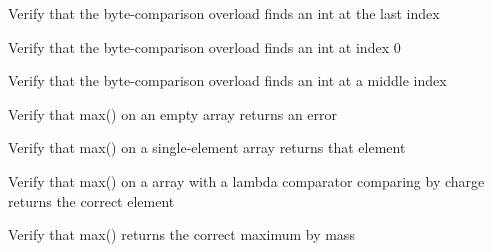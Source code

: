 \begin{DoxyRefList}
%
Verify that the byte-\/comparison overload finds an int at the last index  
\item[Global \doxylink{test__array_8cpp_a2aeee4444ac4a8c1fb3f1c0847d5bbf0}{TEST\+\_\+F} (\doxylink{classArrayInitTest}{Array\+Init\+Test}, Contains\+Byte\+Int\+Finds\+First\+Element)]\label{test__test000167}%
%
Verify that the byte-\/comparison overload finds an int at index 0  
\item[Global \doxylink{test__array_8cpp_ab0bb7275e02d659f2c5b07dd69d661af}{TEST\+\_\+F} (\doxylink{classArrayInitTest}{Array\+Init\+Test}, Contains\+Byte\+Int\+Finds\+Middle\+Element)]\label{test__test000166}%
%
Verify that the byte-\/comparison overload finds an int at a middle index  
\item[Global \doxylink{test__array_8cpp_a40c5438a3304dee13809b7b9ece57088}{TEST\+\_\+F} (\doxylink{classArrayInitTest}{Array\+Init\+Test}, Max\+Particle\+Empty\+Array\+Returns\+Error)]\label{test__test000165}%
%
Verify that max() on an empty  array returns an error  
\item[Global \doxylink{test__array_8cpp_a0835b2523307141187e42164728d918f}{TEST\+\_\+F} (\doxylink{classArrayInitTest}{Array\+Init\+Test}, Max\+Particle\+Single\+Element)]\label{test__test000164}%
%
Verify that max() on a single-\/element  array returns that element  
\item[Global \doxylink{test__array_8cpp_a84563c8e20606653b3adc0f4b27eb097}{TEST\+\_\+F} (\doxylink{classArrayInitTest}{Array\+Init\+Test}, Max\+Particle\+By\+Charge\+With\+Lambda)]\label{test__test000163}%
%
Verify that max() on a  array with a lambda comparator comparing by charge returns the correct element  
\item[Global \doxylink{test__array_8cpp_a82f0563e080e9d429aee7bb007549e00}{TEST\+\_\+F} (\doxylink{classArrayInitTest}{Array\+Init\+Test}, Max\+Particle\+By\+Mass\+Returns\+Correct\+Value)]\label{test__test000162}%
%
Verify that max() returns the correct maximum  by mass  
\item[Global \doxylink{test__array_8cpp_a316067000fcb0180d2f7cce0074b738b}{TEST\+\_\+F} (\doxylink{classArrayInitTest}{Array\+Init\+Test}, Max\+Float\+Does\+Not\+Modify\+Array)]\label{test__test000161}%

\end{DoxyRefList}
